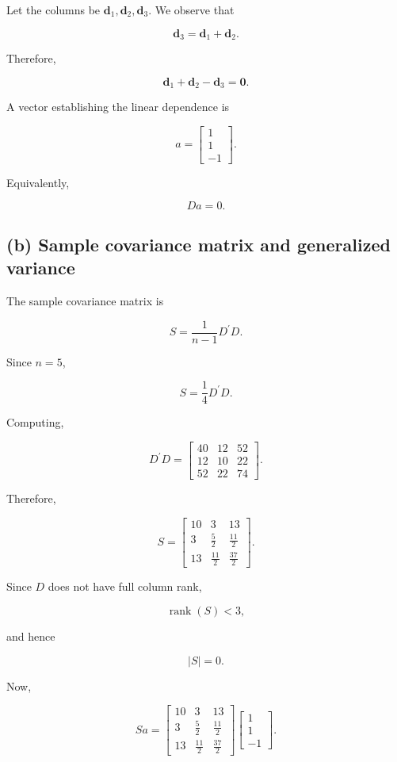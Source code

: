 \documentclass{article}
\begin{document}
Let the columns be \(\mathbf d_1,\mathbf d_2,\mathbf d_3\). We observe that

\[
\mathbf d_3=\mathbf d_1+\mathbf d_2.
\]

Therefore,

\[
\mathbf d_1+\mathbf d_2-\mathbf d_3=\mathbf0.
\]

A vector establishing the linear dependence is

\[
\boxed{
a=
\begin{bmatrix}
1\\1\\-1
\end{bmatrix}}.
\]

Equivalently,

\[
\boxed{Da=0}.
\]

\subsection*{(b) Sample covariance matrix and generalized variance}

The sample covariance matrix is

\[
S=\frac{1}{n-1}D^\prime D.
\]

Since \(n=5\),

\[
S=\frac14D^\prime D.
\]

Computing,

\[
D^\prime D
=
\begin{bmatrix}
40&12&52\\
12&10&22\\
52&22&74
\end{bmatrix}.
\]

Therefore,

\[
\boxed{
S=
\begin{bmatrix}
10&3&13\\
3&\frac52&\frac{11}{2}\\
13&\frac{11}{2}&\frac{37}{2}
\end{bmatrix}}.
\]

Since \(D\) does not have full column rank,

\[
\operatorname{rank}(S)<3,
\]

and hence

\[
\boxed{|S|=0}.
\]

Now,

\[
Sa
=
\begin{bmatrix}
10&3&13\\
3&\frac52&\frac{11}{2}\\
13&\frac{11}{2}&\frac{37}{2}
\end{bmatrix}
\begin{bmatrix}
1\\1\\-1
\end{bmatrix}.
\]
\end{document}
